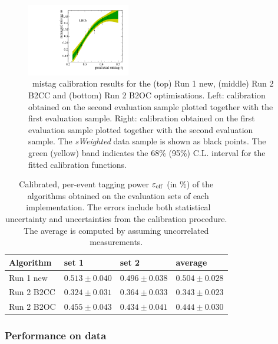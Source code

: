 \begin{figure}[t]
\begin{center}
        \includegraphics[width=0.4\textwidth]{04Flavourtagging/figs/OSelectronOpt/RunIIEval_Bu2D0Pi/eval_on_II.pdf}
        \end{center}
        \vspace{-2mm}
        \caption{\OSe~mistag calibration results for the (top) Run 1 new, (middle) Run 2 B2CC and (bottom) Run 2 B2OC optimisations. Left: calibration obtained on the second evaluation sample plotted together with the first evaluation sample. Right: calibration obtained on the first evaluation sample plotted together with the second evaluation sample. The \emph{sWeighted} data sample is shown as black points. The green (yellow) band indicates the 68\% (95\%) C.L. interval for the fitted calibration functions.}
        \label{fig:OSeetacalib}
\end{figure}

\begin{table}[t]
	\centering
        \caption{Calibrated, per-event tagging power $\varepsilon_{\rm eff}$ (in $\%$) of the \OSe~algorithms obtained on the evaluation sets of each \OSe~implementation. The errors include both statistical uncertainty and uncertainties from the calibration procedure. The average is computed by assuming uncorrelated measurements.}
         \label{tab:OSeperformanceevalset}
        \begin{tabular}{llll}
        \toprule
        Algorithm & set 1 & set 2 & average  \\
        \midrule
        Run 1 new & $0.513\pm0.040$ & $0.496\pm0.038$ & $0.504\pm0.028$ \\
        Run 2 B2CC & $0.324\pm0.031$ & $0.364\pm0.033$ & $0.343\pm0.023$ \\
        Run 2 B2OC & $0.455\pm0.043$ & $0.434\pm0.041$ & $0.444\pm0.030$ \\
        \bottomrule
        \end{tabular}
\end{table}


\subsubsection[Performance on $B^0\to D^-\pi^+$ data]{Performance on  data}
\label{sec:tagging:OSePerf2}

